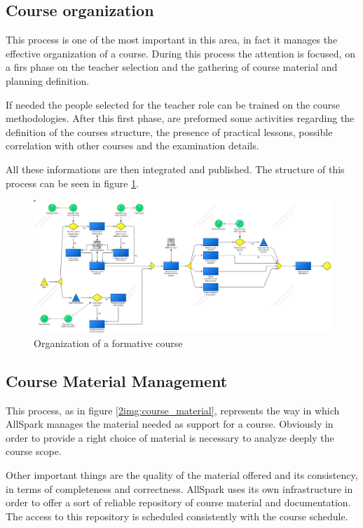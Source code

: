 \subsection{Course organization}
This process is one of the most important in this area, in fact it manages
the effective organization of a course. During this process the attention
is focused, on a firs phase on the teacher selection and the gathering of
course material and planning definition.

If needed the people selected for the teacher role can be trained on the
course methodologies. After this first phase, are preformed  some
activities regarding the definition of the courses structure, the presence
of practical lessons, possible correlation with other courses and the
examination details.

All these informations are then integrated and published. The structure of
this process can be seen in figure \ref{2img:course_organization}.

\begin{figure}[!ht]
\centering
\includegraphics[scale=0.27, angle=90]{assign2/adonis/imgs/course_organization.jpg}
\caption{Organization of a formative course}
\label{2img:course_organization}
\end{figure}

\subsection{Course Material Management}
This process, as in figure \ref{2img:course_material}, represents the way
in which AllSpark manages the material needed as support for a course.
Obviously in order to provide a right choice of material is necessary to
analyze deeply the course scope.

Other important things are the quality of the material offered and its
consistency, in terms of completeness and correctness. AllSpark uses its
own infrastructure in order to offer a sort of reliable repository of
course material and documentation. The access to this repository is
scheduled consistently with the course schedule.


